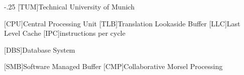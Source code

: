 \documentclass[headsepline,footsepline,footinclude=false,oneside,fontsize=11pt,paper=a4,listof=totoc,bibliography=totoc]{scrbook} %
\begin{document}


\frontmatter{}





\tableofcontents{}

\mainmatter{}







\appendix{}


\begin{acronym}
  \itemsep-.25\baselineskip
  [TUM]{Technical University of Munich}

  [CPU]{Central Processing Unit}
  [TLB]{Translation Lookaside Buffer}
  [LLC]{Last Level Cache}
  [IPC]{instructions per cycle}

  [DBS]{Database System}

  [SMB]{Software Managed Buffer}
  [CMP]{Collaborative Morsel Processing}
\end{acronym}

\newpage
{}
\listofalgorithms{}
\listoffigures{}
\listoftables{}
\printbibliography{}
\end{document}
